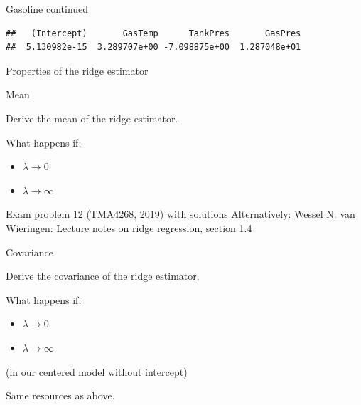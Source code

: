\documentclass[
  ignorenonframetext,
]{beamer}
\newenvironment{Shaded}{\begin{snugshade}}{\end{snugshade}}
\newcommand{\NormalTok}[1]{#1}
\newcommand{\OperatorTok}[1]{\textcolor[rgb]{0.81,0.36,0.00}{\textbf{#1}}}
\providecommand{\tightlist}{%
  \setlength{\itemsep}{0pt}\setlength{\parskip}{0pt}}
\begin{document}
\begin{frame}[fragile]
\begin{block}{Gasoline continued}
\begin{Shaded}
\end{Shaded}

\begin{verbatim}
##   (Intercept)       GasTemp      TankPres       GasPres 
##  5.130982e-15  3.289707e+00 -7.098875e+00  1.287048e+01
\end{verbatim}

\end{block}

\end{frame}

\begin{frame}

\begin{block}{Properties of the ridge estimator}

\begin{block}{Mean}

Derive the mean of the ridge estimator.

What happens if:

\begin{itemize}
\tightlist
\item
  \(\lambda \rightarrow 0\)
\item
  \(\lambda \rightarrow \infty\)
\end{itemize}

\href{https://www.math.ntnu.no/emner/TMA4268/Exam/V2019e.pdf}{Exam
problem 12 (TMA4268, 2019)} with
\href{https://www.math.ntnu.no/emner/TMA4268/Exam/e2019sol.html}{solutions}
Alternatively: \href{https://arxiv.org/pdf/1509.09169.pdf}{Wessel N. van
Wieringen: Lecture notes on ridge regression, section 1.4}

\end{block}

\end{block}

\end{frame}

\begin{frame}

\begin{block}{Covariance}

Derive the covariance of the ridge estimator.

What happens if:

\begin{itemize}
\tightlist
\item
  \(\lambda \rightarrow 0\)
\item
  \(\lambda \rightarrow \infty\)
\end{itemize}

(in our centered model without intercept)

Same resources as above.

\end{block}

\end{frame}
\end{document}
